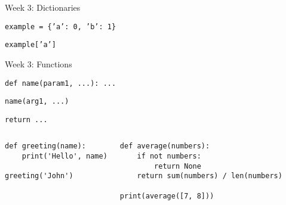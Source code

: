 \documentclass[aspectratio=169,usenames,dvipsnames]{beamer}
\begin{document}
\begin{frame}[fragile]{Week 3: Dictionaries}
    \begin{description}[creation]
        \item[creation] \texttt{example = \{'a': 0, 'b': 1\}}
        \item[lookup] \texttt{example['a']}
    \end{description}
\end{frame}

\begin{frame}[fragile]{Week 3: Functions}
    \begin{description}
        \item[Defining] \texttt{def name(param1, ...): ...}
        \item[Calling] \texttt{name(arg1, ...)}
        \item[Return value] \texttt{return ...}
    \end{description}
    \pause
\begin{columns}[T]
\begin{lstlisting}
def greeting(name):
    print('Hello', name)

greeting('John')
\end{lstlisting}
\begin{lstlisting}
def average(numbers):
    if not numbers:
        return None
    return sum(numbers) / len(numbers)

print(average([7, 8]))
\end{lstlisting}
\end{columns}
\end{frame}
\end{document}
